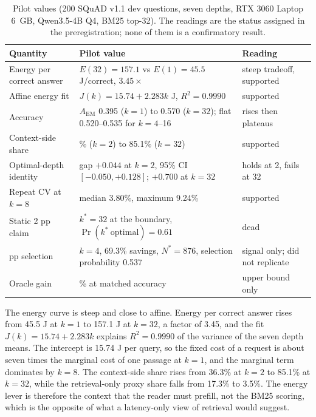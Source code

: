\documentclass[a4paper,fleqn]{cas-sc}
\begin{document}
\begin{table}[pos=htbp]
  \centering
  \caption{Pilot values (200 SQuAD v1.1 dev questions, seven depths, RTX 3060 Laptop 6~GB, Qwen3.5-4B Q4, BM25 top-32). The readings are the status assigned in the preregistration; none of them is a confirmatory result.}
  \label{tab:pilot}
  \footnotesize
  \setlength{\tabcolsep}{5pt}
  \begin{tabular}{@{}>{\raggedright\arraybackslash}p{4.0cm}>{\raggedright\arraybackslash}p{5.7cm}>{\raggedright\arraybackslash}p{5.0cm}@{}}
    \toprule
    \textbf{Quantity} & \textbf{Pilot value} & \textbf{Reading} \\
    \midrule
    Energy per correct answer & $E(32)=157.1$ vs $E(1)=45.5$ J/correct, $3.45\times$ & steep tradeoff, supported \\
    Affine energy fit & $J(k)=15.74+2.283k$ J, $R^{2}=0.9990$ & supported \\
    Accuracy & $A_{\mathrm{EM}}$ 0.395 ($k=1$) to 0.570 ($k=32$); flat 0.520--0.535 for $k=4$--16 & rises then plateaus \\
    Context-side share & 36.3\% ($k=2$) to 85.1\% ($k=32$) & supported \\
    Optimal-depth identity & gap $+0.044$ at $k=2$, 95\% CI $[-0.050,+0.128]$; $+0.700$ at $k=32$ & holds at 2, fails at 32 \\
    Repeat CV at $k=8$ & median 3.80\%, maximum 9.24\% & supported \\
    Static 2 pp claim & $k^{*}=32$ at the boundary, $\Pr(k^{*}\ \text{optimal})=0.61$ & dead \\
    5 pp selection & $k=4$, 69.3\% savings, $N^{*}=876$, selection probability 0.537 & signal only; did not replicate \\
    Oracle gain & 78.8\% at matched accuracy & upper bound only \\
    \bottomrule
  \end{tabular}
\end{table}

The energy curve is steep and close to affine. Energy per correct answer rises from 45.5 J at $k=1$ to 157.1 J at $k=32$, a factor of 3.45, and the fit $J(k)=15.74+2.283k$ explains $R^{2}=0.9990$ of the variance of the seven depth means. The intercept is 15.74 J per query, so the fixed cost of a request is about seven times the marginal cost of one passage at $k=1$, and the marginal term dominates by $k=8$. The context-side share rises from 36.3\% at $k=2$ to 85.1\% at $k=32$, while the retrieval-only proxy share falls from 17.3\% to 3.5\%. The energy lever is therefore the context that the reader must prefill, not the BM25 scoring, which is the opposite of what a latency-only view of retrieval would suggest.
\end{document}
